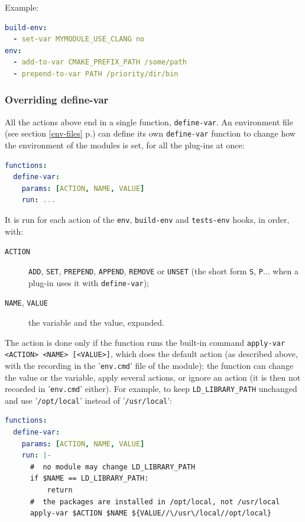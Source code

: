 \documentclass[a4paper,12pt,twoside]{article}
\newcommand{\code}[1]{\texttt{#1}}
\newcommand{\seeref}[1]{see section \ref{#1} p.\pageref{#1}}
\newcommand{\file}[1]{'{\texttt{#1}}'}
\begin{document}
Example:

\begin{lstlisting}[language={yaml}]
build-env:
  - set-var MYMODULE_USE_CLANG no
env:
  - add-to-var CMAKE_PREFIX_PATH /some/path
  - prepend-to-var PATH /priority/dir/bin
\end{lstlisting}

\subsubsection{Overriding define-var}
\label{define-var-override}

All the actions above end in a single function, \code{define-var}. An
environment file (\seeref{env-files}) can define its own
\code{define-var} function to change how the environment of the modules
is set, for all the plug-ins at once:

\begin{lstlisting}[language={yaml}]
functions:
  define-var:
    params: [ACTION, NAME, VALUE]
    run: ...
\end{lstlisting}

It is run for each action of the \code{env}, \code{build-env} and
\code{tests-env} hooks, in order, with:

\begin{description}
	\item[\code{ACTION}] \code{ADD}, \code{SET}, \code{PREPEND},
	\code{APPEND}, \code{REMOVE} or \code{UNSET} (the short form
	\code{S}, \code{P}... when a plug-in uses it with \code{define-var});
	\item[\code{NAME}, \code{VALUE}] the variable and the value, expanded.
\end{description}

The action is done only if the function runs the built-in command
\code{apply-var <ACTION> <NAME> [<VALUE>]}, which does
the default action (as described above, with the recording in the
\file{env.cmd} file of the module): the function can change the value or
the variable, apply several actions, or ignore an action (it is then not
recorded in \file{env.cmd} either). For example, to keep
\code{LD\_LIBRARY\_PATH} unchanged and use \file{/opt/local} instead of
\file{/usr/local}:

\begin{lstlisting}[language={yaml}]
functions:
  define-var:
    params: [ACTION, NAME, VALUE]
    run: |-
      #  no module may change LD_LIBRARY_PATH
      if $NAME == LD_LIBRARY_PATH:
          return
      #  the packages are installed in /opt/local, not /usr/local
      apply-var $ACTION $NAME ${VALUE//\/usr\/local//opt/local}
\end{lstlisting}
\end{document}
